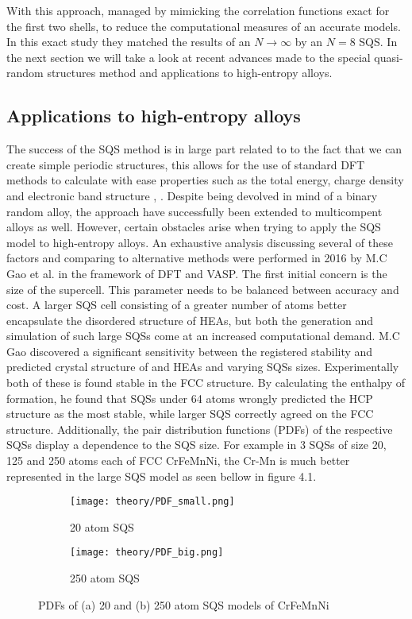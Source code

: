 With this approach, \cite{sqsfull} managed by mimicking the correlation functions exact for the first two shells, to reduce the computational measures of an accurate models. In this exact study they matched the results of an $N \rightarrow \infty$ by an $N=8$ SQS. In the next section we will take a look at recent advances made to the special quasi-random structures method and applications to high-entropy alloys. 

\subsection{Applications to high-entropy alloys}
The success of the SQS method is in large part related to to the fact that we can create simple periodic structures, this allows for the use of standard DFT methods to calculate with ease properties such as the total energy, charge density and electronic band structure \cite{sqs_dos}, \cite{sqs_bg}. Despite being devolved in mind of a binary random alloy, the approach have successfully been extended to multicompent alloys as well. However, certain obstacles arise when trying to apply the SQS model to high-entropy alloys. An exhaustive analysis discussing several of these factors and comparing to alternative methods were performed in 2016 by M.C Gao et al. \cite{hea2016_ch10}  in the framework of DFT and VASP. The first initial concern is the size of the supercell. This parameter  needs to be balanced between accuracy and cost. A larger SQS cell consisting of a greater number of atoms better encapsulate the disordered structure of HEAs, but both the generation and simulation of such large SQSs come at an increased computational demand.  M.C Gao discovered a significant sensitivity between the registered stability and predicted crystal structure of  and  HEAs and varying SQSs sizes. Experimentally both of these is found stable in the FCC structure. By calculating the enthalpy of formation, he found that SQSs under 64 atoms wrongly predicted the HCP structure as the most stable, while larger SQS correctly agreed on the FCC structure. Additionally, the pair distribution functions (PDFs) of the respective SQSs display a dependence to the SQS size. For example in 3 SQSs of size 20, 125 and 250 atoms each of FCC CrFeMnNi, the Cr-Mn is much better represented in the large SQS model as seen bellow in figure 4.1.

\begin{figure}[H]
\begin{subfigure}{.5\textwidth}
\texttt{[image: theory/PDF\_small.png]}
\caption{20 atom SQS}	
\end{subfigure}
\begin{subfigure}{.5\textwidth}
\texttt{[image: theory/PDF\_big.png]}
\caption{250 atom SQS}
\end{subfigure}
\caption{PDFs of (a) 20 and (b) 250 atom SQS models of CrFeMnNi \cite{hea2016_ch10}}
\end{figure}
     
